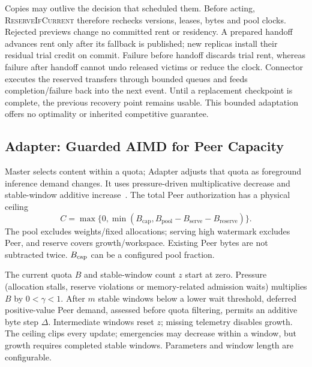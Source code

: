Copies may outlive the decision that scheduled them. Before acting,
\textsc{ReserveIfCurrent} therefore rechecks versions, leases, bytes and pool clocks.
Rejected previews change no committed rent or residency. A prepared
handoff advances rent only after its fallback is published; new replicas
install their residual trial credit on commit. Failure before handoff
discards trial rent, whereas failure after handoff cannot undo released
victims or reduce the clock. Connector executes the reserved transfers
through bounded queues and feeds completion/failure back into the next event.
Until a replacement checkpoint is complete, the previous recovery point
remains usable.
This bounded adaptation offers no optimality or inherited competitive guarantee.

\subsection{Adapter: Guarded AIMD for Peer Capacity}
\label{sec:adapter}

Master selects content within a quota; Adapter adjusts that quota as
foreground inference demand changes. It uses pressure-driven multiplicative
decrease and stable-window additive increase~\cite{chiu1989aimd}.
The total Peer authorization has a physical ceiling
\begin{equation}
 C=\max\{0,\min(B_{\mathrm{cap}},
 B_{\mathrm{pool}}-B_{\mathrm{serve}}-B_{\mathrm{reserve}})\}.
 \label{eq:peer-ceiling}
\end{equation}
The pool excludes weights/fixed allocations; serving high watermark
excludes Peer, and reserve covers growth/workspace. Existing Peer bytes
are not subtracted twice. $B_{\rm cap}$ can be a configured pool fraction.

The current quota $B$ and stable-window count $z$ start at zero.
Pressure (allocation stalls, reserve violations or
memory-related admission waits) multiplies $B$ by $0<\gamma<1$. After $m$
stable windows below a lower wait threshold, deferred positive-value Peer
demand, assessed before quota filtering, permits an additive byte step
$\Delta$. Intermediate windows reset
$z$; missing telemetry disables growth. The ceiling clips every update;
emergencies may decrease within a window, but growth requires completed
stable windows. Parameters and window length are configurable.

